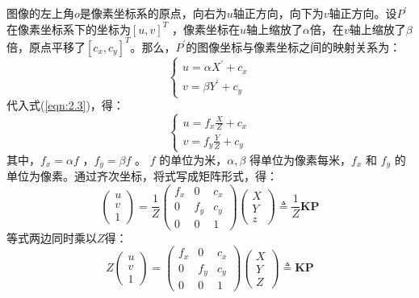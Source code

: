 图像的左上角$o $是像素坐标系的原点，向右为$u $轴正方向，向下为$v $轴正方向。设$P^{\prime} $在像素坐标系下的坐标为$[u, v]^{T} $ ，像素坐标在$u $轴上缩放了$\alpha $倍，在$v $轴上缩放了$\beta $倍，原点平移了$\left[c_{x}, c_{y}\right]^{T} $。那么，$P^{\prime} $的图像坐标与像素坐标之间的映射关系为：
\begin{equation}
\label{eqn:2.4}
\left\{\begin{array}{l}{u=\alpha X^{\prime}+c_{x}} \\ {v=\beta Y^{\prime}+c_{y}}\end{array}\right.
\end{equation}
代入式(\ref{eqn:2.3})，得：
\begin{equation}
\label{eqn:2.5}
\left\{\begin{array}{l}{u=f_{x} \frac{X}{Z}+c_{x}} \\ {v=f_{y} \frac{Y}{Z}+c_{y}}\end{array}\right.
\end{equation}
其中，$f_x=\alpha f$ ，$f_y=\beta f  $ 。 $f $ 的单位为米，$\alpha ,\beta $ 得单位为像素每米，$f_x $  和 $f_y $  的单位为像素。通过齐次坐标，将式写成矩阵形式，得：
\begin{equation}
\label{eqn:2.6}
\left( 
\begin{array}{l}{u} \\ {v} \\ {1}\end{array}
\right)=
\frac{1}{Z} \left( 
\begin{array}{ccc}{f_{x}} & {0} & {c_{x}} \\ {0} & {f_{y}} & {c_{y}} \\ {0} & {0} & {1}\end{array}
\right) 
\left( 
\begin{array}{l}{X} \\ {Y} \\ {z}\end{array}
\right) 
\triangleq \frac{1}{Z} \bm{K} \bm{P}
\end{equation}
等式两边同时乘以$Z $得：
\begin{equation}\label{eqn:2.7}
Z \left( \begin{array}{l}{u} \\ {v} \\ {1}\end{array}\right)=\left( \begin{array}{ccc}{f_{x}} & {0} & {c_{x}} \\ {0} & {f_{y}} & {c_{y}} \\ {0} & {0} & {1}\end{array}\right) \left( \begin{array}{l}{X} \\ {Y} \\ {Z}\end{array}\right) \triangleq \bm{K} \bm{P}
\end{equation}
